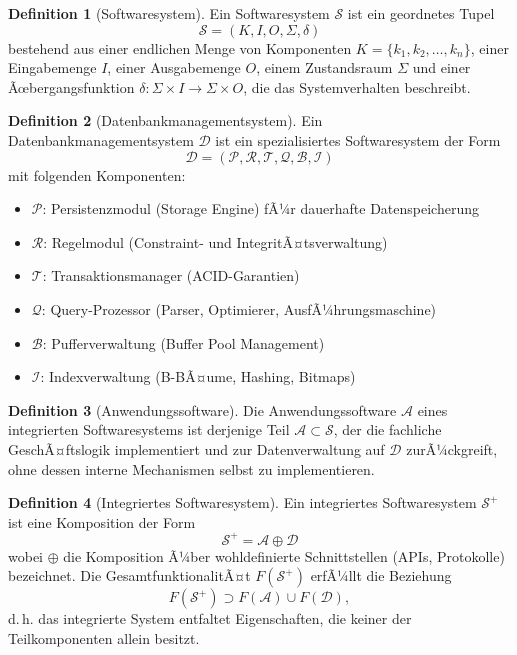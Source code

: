 ﻿\documentclass[a4paper,12pt]{article}
\theoremstyle{definition}
\newtheorem{definition}{Definition}
\begin{document}
\begin{definition}[Softwaresystem]
\label{def:softwaresystem}
Ein Softwaresystem $\mathcal{S}$ ist ein geordnetes Tupel
\[
\mathcal{S} = (K, I, O, \Sigma, \delta)
\]
bestehend aus einer endlichen Menge von Komponenten $K = \{k_1, k_2, \ldots, k_n\}$, einer Eingabemenge $I$, einer Ausgabemenge $O$, einem Zustandsraum $\Sigma$ und einer Ãœbergangsfunktion $\delta: \Sigma \times I \to \Sigma \times O$, die das Systemverhalten beschreibt.
\end{definition}

\begin{definition}[Datenbankmanagementsystem]
\label{def:dbms}
Ein Datenbankmanagementsystem $\mathcal{D}$ ist ein spezialisiertes Softwaresystem der Form
\[
\mathcal{D} = (\mathcal{P}, \mathcal{R}, \mathcal{T}, \mathcal{Q}, \mathcal{B}, \mathcal{I})
\]
mit folgenden Komponenten:
\begin{itemize}
	\item $\mathcal{P}$: Persistenzmodul (Storage Engine) fÃ¼r dauerhafte Datenspeicherung
	\item $\mathcal{R}$: Regelmodul (Constraint- und IntegritÃ¤tsverwaltung)
	\item $\mathcal{T}$: Transaktionsmanager (ACID-Garantien)
	\item $\mathcal{Q}$: Query-Prozessor (Parser, Optimierer, AusfÃ¼hrungsmaschine)
	\item $\mathcal{B}$: Pufferverwaltung (Buffer Pool Management)
	\item $\mathcal{I}$: Indexverwaltung (B-BÃ¤ume, Hashing, Bitmaps)
\end{itemize}
\end{definition}

\begin{definition}[Anwendungssoftware]
\label{def:anwendung}
Die Anwendungssoftware $\mathcal{A}$ eines integrierten Softwaresystems ist derjenige Teil $\mathcal{A} \subset \mathcal{S}$, der die fachliche GeschÃ¤ftslogik implementiert und zur Datenverwaltung auf $\mathcal{D}$ zurÃ¼ckgreift, ohne dessen interne Mechanismen selbst zu implementieren.
\end{definition}

\begin{definition}[Integriertes Softwaresystem]
\label{def:integriert}
Ein integriertes Softwaresystem $\mathcal{S}^+$ ist eine Komposition der Form
\[
\mathcal{S}^+ = \mathcal{A} \oplus \mathcal{D}
\]
wobei $\oplus$ die Komposition Ã¼ber wohldefinierte Schnittstellen (APIs, Protokolle) bezeichnet. Die GesamtfunktionalitÃ¤t $F(\mathcal{S}^+)$ erfÃ¼llt die Beziehung
\[
F(\mathcal{S}^+) \supset F(\mathcal{A}) \cup F(\mathcal{D}),
\]
d.\,h. das integrierte System entfaltet Eigenschaften, die keiner der Teilkomponenten allein besitzt.
\end{definition}
\end{document}
